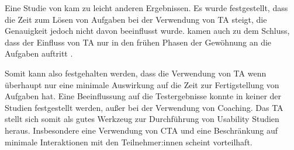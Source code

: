 Eine Studie von \textcite{rheniusEvaluationConcurrent1990} kam zu leicht anderen Ergebnissen. Es wurde festgestellt, dass die Zeit zum Lösen von Aufgaben bei der Verwendung von \ac{TA} steigt, die Genauigkeit jedoch nicht davon beeinflusst wurde. \citeauthor{rheniusEvaluationConcurrent1990} kamen auch zu dem Schluss, dass der Einfluss von \ac{TA} nur in den frühen Phasen der Gewöhnung an die Aufgaben auftritt \parencite{rheniusEvaluationConcurrent1990}.

Somit kann also festgehalten werden, dass die Verwendung von \ac{TA} wenn überhaupt nur eine minimale Auswirkung auf die Zeit zur Fertigstellung von Aufgaben hat. Eine Beeinflussung auf die Testergebnisse konnte in keiner der Studien festgestellt werden, außer bei der Verwendung von Coaching. Das \acl{TA} stellt sich somit als gutes Werkzeug zur Durchführung von Usability Studien heraus. Insbesondere eine Verwendung von \acl{CTA} und eine Beschränkung auf minimale Interaktionen mit den Teilnehmer:innen scheint vorteilhaft.
